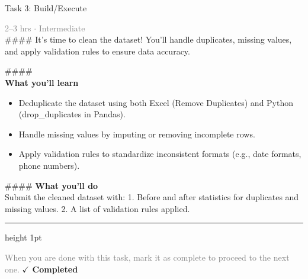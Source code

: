 \documentclass[10pt,a4paper]{article}
\begin{document}
\begin{taskbox}{Task 3: Build/Execute}

    {\small \textcolor{gray}{2--3 hrs $\cdot$ Intermediate}}\\[12pt]

    \#\#\#\#   
It’s time to clean the dataset! You’ll handle duplicates, missing values, and apply validation rules to ensure data accuracy.  

\#\#\#\# \\[10pt]
\vspace{8pt}
{\large \textbf{\textcolor{brandLight}{What you'll learn}}}\\[4pt]  
\begin{itemize}
    \item Deduplicate the dataset using both Excel (Remove Duplicates) and Python (drop\_duplicates in Pandas).  
    \item Handle missing values by imputing or removing incomplete rows.  
    \item Apply validation rules to standardize inconsistent formats (e.g., date formats, phone numbers).  
\end{itemize}

\#\#\#\# \vspace{8pt}
{\large \textbf{\textcolor{brandLight}{What you'll do}}}\\[4pt]  
Submit the cleaned dataset with:  
1. Before and after statistics for duplicates and missing values.  
2. A list of validation rules applied.\par

    \vspace{16pt}

    \textcolor{cardBorder}{\hrule height 1pt}\vspace{8pt}

    \small \textcolor{gray}{When you are done with this task, mark it as complete to proceed to the next one.} \hfill \textbf{\textcolor{brandDark}{$\checkmark$ Completed}}

\end{taskbox}
\end{document}
